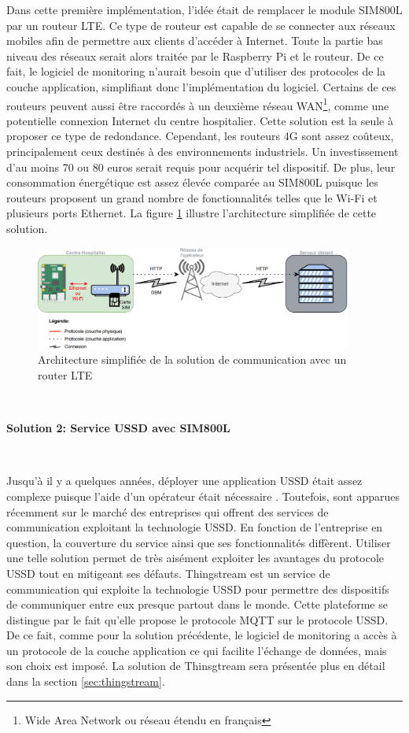 \noindent
Dans cette première implémentation, l'idée était de remplacer le module SIM800L par un routeur LTE. Ce type de routeur est capable de se connecter aux réseaux mobiles afin de permettre aux clients d'accéder à Internet. Toute la partie bas niveau des réseaux serait alors traitée par le Raspberry Pi et le routeur. De ce fait, le logiciel de monitoring n'aurait besoin que d'utiliser des protocoles de la couche application, simplifiant donc l'implémentation du logiciel. Certains de ces routeurs peuvent aussi être raccordés à un deuxième réseau WAN\footnote{Wide Area Network ou réseau étendu en français}, comme une potentielle connexion Internet du centre hospitalier. Cette solution est la seule à proposer ce type de redondance. Cependant, les routeurs 4G sont assez coûteux, principalement ceux destinés à des environnements industriels. Un investissement d'au moins 70 ou 80 euros serait requis pour acquérir tel dispositif. De plus, leur consommation énergétique est assez élevée comparée au SIM800L puisque les routeurs proposent un grand nombre de fonctionnalités telles que le Wi-Fi et plusieurs ports Ethernet. La figure \ref{fig:so1} illustre l'architecture simplifiée de cette solution.

\begin{figure}[ht!]
  \centering
  \includegraphics[width=0.93\textwidth]{img/el_prototype/solution1_com.png}
  \caption{Architecture simplifiée de la solution de communication avec un router LTE}
  \label{fig:so1}
\end{figure}

~


\textbf{Solution 2: Service USSD avec SIM800L}

\vspace{-0.2cm}
~

\noindent
Jusqu'à il y a quelques années, déployer une application USSD était assez complexe puisque l'aide d'un opérateur était nécessaire \cite{perrier2015ussd}. Toutefois, sont apparues récemment sur le marché des entreprises qui offrent des services de communication exploitant la technologie USSD. En fonction de l'entreprise en question, la couverture du service ainsi que ses fonctionnalités diffèrent. Utiliser une telle solution permet de très aisément exploiter les avantages du protocole USSD tout en mitigeant ses défauts. Thingstream est un service de communication qui exploite la technologie USSD pour permettre des dispositifs de communiquer entre eux presque partout dans le monde. Cette plateforme se distingue par le fait qu'elle propose le protocole MQTT sur le protocole USSD. De ce fait, comme pour la solution précédente, le logiciel de monitoring a accès à un protocole de la couche application ce qui facilite l'échange de données, mais son choix est imposé. La solution de Thinsgtream sera présentée plus en détail dans la section \ref{sec:thingstream}.


